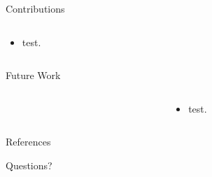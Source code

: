 \documentclass{beamer}
\begin{document}
\begin{frame}{Contributions}
\begin{columns}
\begin{column}{5cm}
\begin{itemize}
	\item test.
\end{itemize}
\end{column}
\begin{column}{5cm}
\end{column}
\end{columns}
\end{frame}

\begin{frame}{Future Work}
\begin{columns}
\begin{column}{5cm}
\end{column}
\begin{column}{5cm}
\begin{itemize}
	\item test.
\end{itemize}
\end{column}
\end{columns}
\end{frame}

\begin{frame}[allowframebreaks]{References}


\end{frame}

\begin{frame}{Questions?}
\end{frame}
\end{document}
